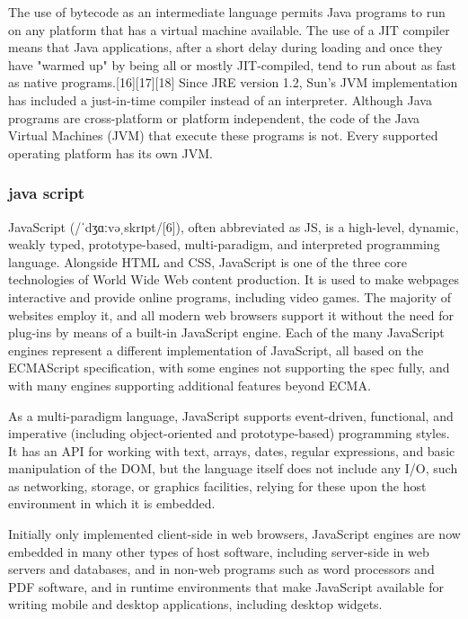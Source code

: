 \documentclass[a4paper,12pt]{article}
\begin{document}
The use of bytecode as an intermediate language permits Java programs to run on any platform that has a virtual machine available. The use of a JIT compiler means that Java applications, after a short delay during loading and once they have "warmed up" by being all or mostly JIT-compiled, tend to run about as fast as native programs.[16][17][18] Since JRE version 1.2, Sun's JVM implementation has included a just-in-time compiler instead of an interpreter. Although Java programs are cross-platform or platform independent, the code of the Java Virtual Machines (JVM) that execute these programs is not. Every supported operating platform has its own JVM.
\newpage

\subsubsection{java script}
JavaScript (/ˈdʒɑːvəˌskrɪpt/[6]), often abbreviated as JS, is a high-level, dynamic, weakly typed, prototype-based, multi-paradigm, and interpreted programming language. Alongside HTML and CSS, JavaScript is one of the three core technologies of World Wide Web content production. It is used to make webpages interactive and provide online programs, including video games. The majority of websites employ it, and all modern web browsers support it without the need for plug-ins by means of a built-in JavaScript engine. Each of the many JavaScript engines represent a different implementation of JavaScript, all based on the ECMAScript specification, with some engines not supporting the spec fully, and with many engines supporting additional features beyond ECMA.

As a multi-paradigm language, JavaScript supports event-driven, functional, and imperative (including object-oriented and prototype-based) programming styles. It has an API for working with text, arrays, dates, regular expressions, and basic manipulation of the DOM, but the language itself does not include any I/O, such as networking, storage, or graphics facilities, relying for these upon the host environment in which it is embedded.

Initially only implemented client-side in web browsers, JavaScript engines are now embedded in many other types of host software, including server-side in web servers and databases, and in non-web programs such as word processors and PDF software, and in runtime environments that make JavaScript available for writing mobile and desktop applications, including desktop widgets.
\end{document}
